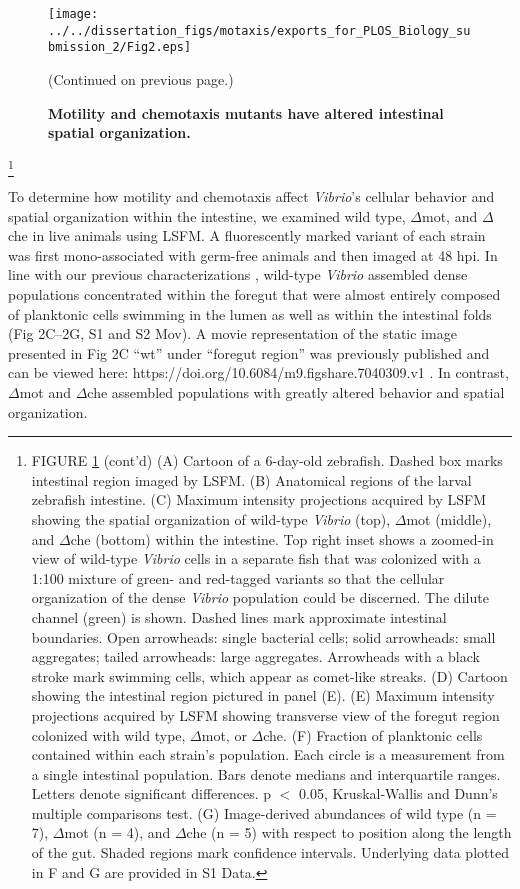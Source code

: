 {\begin{figure}%
	\centerline{
		\texttt{[image: ../../dissertation\_figs/motaxis/exports\_for\_PLOS\_Biology\_submission\_2/Fig2.eps]}}
	\caption{\textbf{Motility and chemotaxis mutants have altered intestinal spatial organization.}}{(Continued on previous page.)}
	\label{fig:motaxis_fig2}
\end{figure}

{\let\thefootnote\relax\footnote{FIGURE \ref{fig:motaxis_fig2} (cont'd) (A) Cartoon of a 6-day-old zebrafish. Dashed box marks intestinal region imaged by LSFM. (B) Anatomical regions of the larval zebrafish intestine. (C) Maximum intensity projections acquired by LSFM showing the spatial organization of wild-type \textit{Vibrio} (top), $\Delta$mot (middle), and $\Delta$che (bottom) within the intestine. Top right inset shows a zoomed-in view of wild-type \textit{Vibrio} cells in a separate fish that was colonized with a 1:100 mixture of green- and red-tagged variants so that the cellular organization of the dense \textit{Vibrio} population could be discerned. The dilute channel (green) is shown. Dashed lines mark approximate intestinal boundaries. Open arrowheads: single bacterial cells; solid arrowheads: small aggregates; tailed arrowheads: large aggregates. Arrowheads with a black stroke mark swimming cells, which appear as comet-like streaks. (D) Cartoon showing the intestinal region pictured in panel (E). (E) Maximum intensity projections acquired by LSFM showing transverse view of the foregut region colonized with wild type, $\Delta$mot, or $\Delta$che. (F) Fraction of planktonic cells contained within each strain's population. Each circle is a measurement from a single intestinal population. Bars denote medians and interquartile ranges. Letters denote significant differences. p $ < $ 0.05, Kruskal-Wallis and Dunn's multiple comparisons test. (G) Image-derived abundances of wild type (n = 7), $\Delta$mot (n = 4), and $\Delta$che (n = 5) with respect to position along the length of the gut. Shaded regions mark confidence intervals. Underlying data plotted in F and G are provided in S1 Data.}


To determine how motility and chemotaxis affect \textit{Vibrio}'s cellular behavior and spatial organization within the intestine, we examined wild type, $\Delta$mot, and $\Delta$che in live animals using LSFM. A fluorescently marked variant of each strain was first mono-associated with germ-free animals and then imaged at 48 hpi. In line with our previous characterizations \cite{wiles_modernized_2018,schlomann_bacterial_2018}, wild-type \textit{Vibrio} assembled dense populations concentrated within the foregut that were almost entirely composed of planktonic cells swimming in the lumen as well as within the intestinal folds (Fig 2C–2G, S1 and S2 Mov). A movie representation of the static image presented in Fig 2C ``wt'' under ``foregut region'' was previously published and can be viewed here: https://doi.org/10.6084/m9.figshare.7040309.v1 \cite{wiles_modernized_2018}. In contrast, $\Delta$mot and $\Delta$che assembled populations with greatly altered behavior and spatial organization. 

}}
